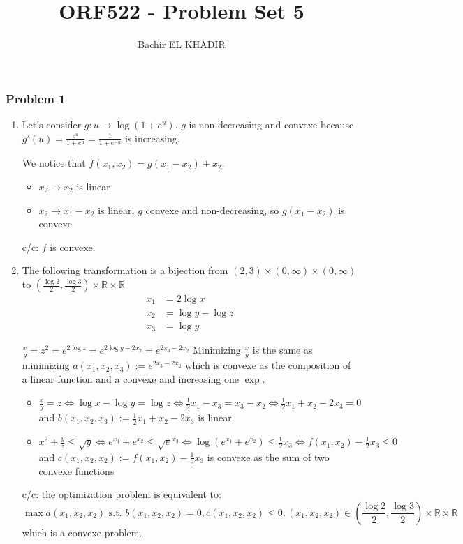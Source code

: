 \documentclass[12pt]{article}
\title{ORF522 - Problem Set 5}
\author{Bachir EL KHADIR }
\newcommand{\Q}[1]{\subsubsection*{Problem #1}}
\begin{document}
\Q{1}
\begin{enumerate}
\item Let's consider $g: u \rightarrow \log(1+e^u)$.  $g$ is
  non-decreasing and convexe because
  $g'(u) = \frac{e^u}{1+e^u} = \frac1 {1+e^{-u}}$ is increasing.

  We notice that $f(x_1, x_2) = g(x_1 - x_2) + x_2$.

  \begin{itemize}
  \item $x_2 \rightarrow x_2$ is linear
  \item $x_2 \rightarrow x_1 - x_2$ is linear, $g$ convexe and
    non-decreasing, so $g(x_1 - x_2)$ is convexe
  \end{itemize}

  c/c: $f$ is convexe.

\item
  The following transformation is a bijection from $(2, 3) \times (0, \infty) \times (0, \infty)$ to  $(\frac{\log 2}2, \frac{\log 3}2) \times \mathbb R \times \mathbb R$
  \begin{align*}
    x_1 &= 2 \log x \\
    x_2 &= \log y - \log z\\
    x_3 &= \log y
  \end{align*}

  $\frac x y  = z^2 = e^{2\log z} = e^{2 \log y - 2 x_2} = e^{2 x_3 - 2 x_2} $
  Minimizing $\frac x y$ is the same as minimizing $a(x_1, x_2, x_3) := e^{2 x_3 - 2 x_2}$
  which is convexe as the composition of a linear function
  and a convexe and increasing one $\exp$.


  \begin{itemize}
  \item
    $\frac x y = z \iff \log x - \log y = \log z \iff  \frac12 x_1 - x_3
    = x_3 - x_2 \iff \frac12
    x_1 + x_2 - 2 x_3 = 0$ and
    $b(x_1, x_2, x_3) := \frac12 x_1 + x_2 - 2 x_3$ is linear.
  \item
    $x^2 + \frac y z \le \sqrt y \iff e^{x_1} + e^{x_2}  \le \sqrt e^{x_3}
    \iff \log(e^{x_1} + e^{x_2})  \le \frac12 x_3
    \iff f(x_1, x_2) - \frac12 x_3  \le 0
    $
    and $c(x_1, x_2, x_2) := f(x_1, x_2) - \frac12 x_3$ is convexe as the sum of two convexe functions
  \end{itemize}

  c/c: the optimization problem is equivalent to:
  $$\max a(x_1, x_2, x_2) \text{ s.t. } b(x_1, x_2, x_2) = 0, c(x_1, x_2, x_2) \le 0,
  (x_1, x_2, x_2) \in (\frac{\log 2}2, \frac{\log 3}2) \times \mathbb R \times \mathbb R $$
  which is a convexe problem.
\end{enumerate}
\end{document}
